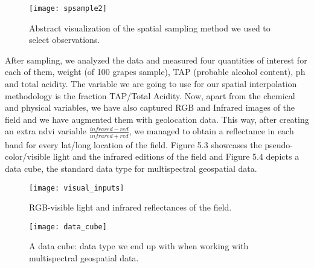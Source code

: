 \documentclass[12pt,a4paper,oneside]{book}
\theoremstyle{plain}
\theoremstyle{definition}
\begin{document}
{\begin{figure}[h]
\begin{center}
\texttt{[image: spsample2]}
\caption{Abstract visualization of the spatial sampling method we used to select observations.}
\end{center}
\end{figure}    

\vspace{3mm}
\noindent
After sampling, we analyzed the data and measured four quantities of interest for each of them, weight (of 100 grapes sample), TAP (probable alcohol content), ph and total acidity. The variable we are going to use for our spatial interpolation methodology is the fraction TAP/Total Acidity. Now, apart from the chemical and physical variables, we have also captured RGB and Infrared images of the field and we have augmented them with geolocation data. This way, after creating an extra ndvi variable $\frac{infrared-red}{infrared +red}$, we managed to obtain a reflectance in each band for every lat/long location of the field. Figure 5.3 showcases the pseudo-color/visible light and the infrared editions of the field and Figure 5.4 depicts a data cube, the standard data type for multispectral geospatial data. 
\begin{figure}[h]
\begin{center}
\texttt{[image: visual\_inputs]}
\caption{RGB-visible light and infrared reflectances of the field.}
\end{center}
\end{figure}
\begin{figure}[h]
\begin{flushright}
\texttt{[image: data\_cube]}
\caption{A data cube: data type we end up with when working with multispectral geospatial data.}
\end{flushright}
\end{figure}

}
\end{document}
